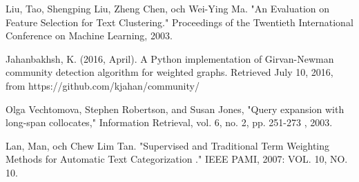 \documentclass[conference]{IEEEtran}
\begin{document}
\begin{thebibliography}{1}
Liu, Tao, Shengping Liu, Zheng Chen, och Wei-Ying Ma. "An Evaluation on Feature
Selection for Text Clustering." Proceedings of the Twentieth International
Conference on Machine Learning, 2003.

Jahanbakhsh, K. (2016, April). A Python implementation of Girvan-Newman community detection algorithm for weighted graphs. Retrieved July 10, 2016, from https://github.com/kjahan/community/

Olga Vechtomova, Stephen Robertson, and Susan Jones, "Query expansion with long-span collocates," Information Retrieval, vol. 6, no. 2, pp. 251-273 , 2003.

Lan, Man, och Chew Lim Tan. "Supervised and Traditional Term Weighting Methods for
Automatic Text Categorization ." IEEE PAMI, 2007: VOL. 10, NO. 10.

\end{thebibliography}





\end{document}
